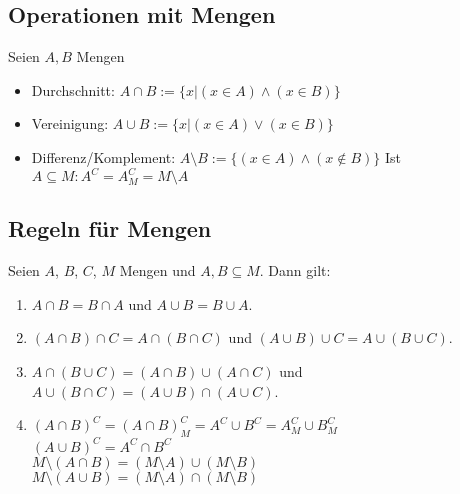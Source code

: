 \documentclass{article}
\begin{document}
        \subsection{Operationen mit Mengen}
            Seien $A,B$ Mengen
            \begin{itemize}
                \item Durchschnitt: $A\cap B :=\{x|(x\in A)\land (x\in B)\}$
                \item Vereinigung: $A\cup B :=\{x|(x\in A)\lor (x\in B)\}$
                \item Differenz/Komplement: $A\setminus B :=\{(x\in A)\land (x \notin B)\}$
                \subitem Ist $A\subseteq M: A^C=A^C_M=M\setminus A $
            \end{itemize}

        \subsection{Regeln für Mengen}
        Seien $A$, $B$, $C$, $M$ Mengen und $A, B \subseteq M$. Dann gilt:
            \begin{enumerate}
                \item $A \cap B = B \cap A$ und $A \cup B = B \cup A$.
                \item $(A \cap B) \cap C = A \cap (B \cap C)$ und $(A \cup B) \cup C = A \cup (B \cup C)$.
                \item $A \cap (B \cup C) = (A \cap B) \cup (A \cap C)$ und $A \cup (B \cap C) = (A \cup B) \cap (A \cup C)$.
                \item $(A \cap B)^C = (A \cap B)^C_M = A^C \cup B^C = A^C_M \cup B^C_M $\\
                $(A \cup B)^C = A^C \cap B^C$\\
                $M\setminus (A \cap B) = (M\setminus A) \cup (M\setminus B)$\\
                $M\setminus (A \cup B) = (M\setminus A) \cap (M\setminus B)$\\                         
            \end{enumerate}
\end{document}
